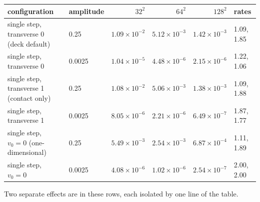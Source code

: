 \documentclass[11pt,a4paper]{article}
\begin{document}
\begin{center}
\footnotesize
\begin{tabular}{llrrrl}
\toprule
configuration & amplitude & $32^2$ & $64^2$ & $128^2$ & rates \\
\midrule
single step, transverse 0 (deck default) & 0.25 & $1.09\times10^{-2}$ & $5.12\times10^{-3}$ & $1.42\times10^{-3}$ & 1.09, 1.85 \\
single step, transverse 0 & 0.0025 & $1.04\times10^{-5}$ & $4.48\times10^{-6}$ & $2.15\times10^{-6}$ & 1.22, 1.06 \\
single step, transverse 1 (contact only) & 0.25 & $1.08\times10^{-2}$ & $5.06\times10^{-3}$ & $1.38\times10^{-3}$ & 1.09, 1.88 \\
single step, transverse 1 & 0.0025 & $8.05\times10^{-6}$ & $2.21\times10^{-6}$ & $6.49\times10^{-7}$ & 1.87, 1.77 \\
single step, $v_0 = 0$ (one-dimensional) & 0.25 & $5.49\times10^{-3}$ & $2.54\times10^{-3}$ & $6.87\times10^{-4}$ & 1.11, 1.89 \\
single step, $v_0 = 0$ & 0.0025 & $4.08\times10^{-6}$ & $1.02\times10^{-6}$ & $2.54\times10^{-7}$ & 2.00, 2.00 \\
\bottomrule
\end{tabular}
\end{center}

Two separate effects are in these rows, each isolated by one line of the
table.
\end{document}
